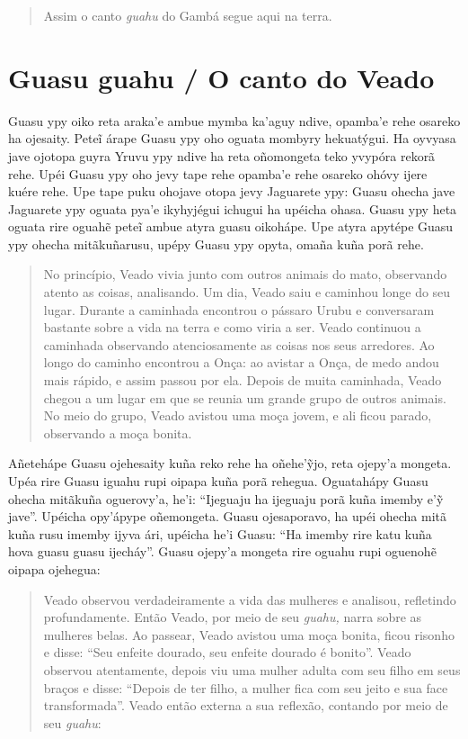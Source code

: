 \begin{quote}
Assim o canto \emph{guahu} do Gambá segue aqui na terra.
\end{quote}

\chapter{Guasu guahu / O canto do Veado}

Guasu ypy oiko reta araka'e ambue mymba ka'aguy ndive, opamba'e rehe
osareko ha ojesaity. Peteĩ árape Guasu ypy oho oguata mombyry
hekuatýgui. Ha oyvyasa jave ojotopa guyra Yruvu ypy ndive ha reta
oñomongeta teko yvypóra rekorã rehe. Upéi Guasu ypy oho jevy tape rehe
opamba'e rehe osareko ohóvy ijere kuére rehe. Upe tape puku ohojave
otopa jevy Jaguarete ypy: Guasu ohecha jave Jaguarete ypy oguata pya'e
ikyhyjégui ichugui ha upéicha ohasa. Guasu ypy heta oguata rire oguahẽ
peteĩ ambue atyra guasu oikohápe. Upe atyra apytépe Guasu ypy ohecha
mitãkuñarusu, upépy Guasu ypy opyta, omaña kuña porã rehe.

\begin{quote}
No princípio, Veado vivia junto com outros animais do mato, observando
atento as coisas, analisando. Um dia, Veado saiu e caminhou longe do seu
lugar. Durante a caminhada encontrou o pássaro Urubu e conversaram
bastante sobre a vida na terra e como viria a ser. Veado continuou a
caminhada observando atenciosamente as coisas nos seus arredores. Ao
longo do caminho encontrou a Onça: ao avistar a Onça, de medo andou mais
rápido, e assim passou por ela. Depois de muita caminhada, Veado chegou
a um lugar em que se reunia um grande grupo de outros animais. No meio
do grupo, Veado avistou uma moça jovem, e ali ficou parado, observando a
moça bonita.
\end{quote}

Añetehápe Guasu ojehesaity kuña reko rehe ha oñehe'ỹjo, reta ojepy'a
mongeta. Upéa rire Guasu iguahu rupi oipapa kuña porã rehegua.
Oguatahápy Guasu ohecha mitãkuña oguerovy'a, he'i: ``Ijeguaju ha
ijeguaju porã kuña imemby e'ỹ jave''. Upéicha opy'ápype oñemongeta.
Guasu ojesaporavo, ha upéi ohecha mitã kuña rusu imemby ijyva ári,
upéicha he'i Guasu: ``Ha imemby rire katu kuña hova guasu guasu
ijecháy''. Guasu ojepy'a mongeta rire oguahu rupi oguenohẽ oipapa
ojehegua:

\begin{quote}
Veado observou verdadeiramente a vida das mulheres e analisou,
refletindo profundamente. Então Veado, por meio de seu \emph{guahu,}
narra sobre as mulheres belas. Ao passear, Veado avistou uma moça
bonita, ficou risonho e disse: ``Seu enfeite dourado, seu enfeite
dourado é bonito''. Veado observou atentamente, depois viu uma mulher
adulta com seu filho em seus braços e disse: ``Depois de ter filho, a
mulher fica com seu jeito e sua face transformada''. Veado então externa
a sua reflexão, contando por meio de seu \emph{guahu}:
\end{quote}

